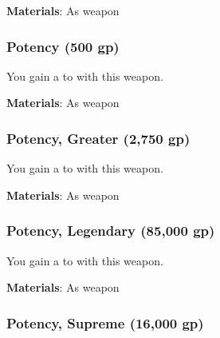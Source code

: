 \vspace{0.25em}
\textbf{Materials}: As weapon


\lowercase{\hypertarget{item:Potency}{}}\label{item:Potency}
\hypertarget{item:Potency}{\subsubsection{Potency\hfill{} (500 gp)}}

You gain a   to  with this weapon.



\vspace{0.25em}
\textbf{Materials}: As weapon


\lowercase{\hypertarget{item:Potency, Greater}{}}\label{item:Potency, Greater}
\hypertarget{item:Potency, Greater}{\subsubsection{Potency, Greater\hfill{} (2,750 gp)}}

You gain a   to  with this weapon.



\vspace{0.25em}
\textbf{Materials}: As weapon


\lowercase{\hypertarget{item:Potency, Legendary}{}}\label{item:Potency, Legendary}
\hypertarget{item:Potency, Legendary}{\subsubsection{Potency, Legendary\hfill{} (85,000 gp)}}

You gain a   to  with this weapon.



\vspace{0.25em}
\textbf{Materials}: As weapon


\lowercase{\hypertarget{item:Potency, Supreme}{}}\label{item:Potency, Supreme}
\hypertarget{item:Potency, Supreme}{\subsubsection{Potency, Supreme\hfill{} (16,000 gp)}}

